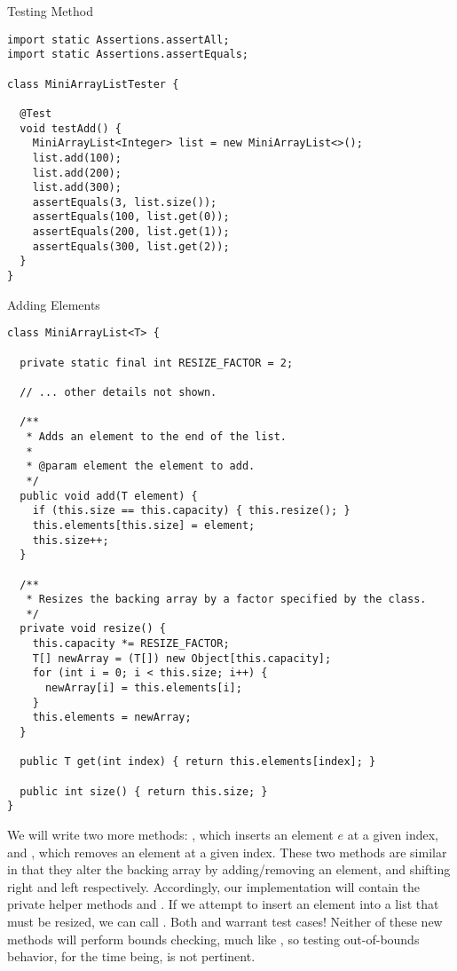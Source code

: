 \begin{cl}{Testing   Method}
\begin{lstlisting}[language=MyJava]
import static Assertions.assertAll;
import static Assertions.assertEquals;

class MiniArrayListTester {

  @Test
  void testAdd() {
    MiniArrayList<Integer> list = new MiniArrayList<>();
    list.add(100);
    list.add(200);
    list.add(300);
    assertEquals(3, list.size());
    assertEquals(100, list.get(0));
    assertEquals(200, list.get(1));
    assertEquals(300, list.get(2));
  }
}
\end{lstlisting}
\end{cl}

\begin{cl}{ Adding Elements}
\begin{lstlisting}[language=MyJava]
class MiniArrayList<T> {

  private static final int RESIZE_FACTOR = 2;

  // ... other details not shown.

  /**
   * Adds an element to the end of the list.
   * 
   * @param element the element to add.
   */
  public void add(T element) {
    if (this.size == this.capacity) { this.resize(); }
    this.elements[this.size] = element;
    this.size++;
  }

  /**
   * Resizes the backing array by a factor specified by the class.
   */
  private void resize() {
    this.capacity *= RESIZE_FACTOR;
    T[] newArray = (T[]) new Object[this.capacity];
    for (int i = 0; i < this.size; i++) {
      newArray[i] = this.elements[i];
    }
    this.elements = newArray;
  }

  public T get(int index) { return this.elements[index]; }

  public int size() { return this.size; }
}
\end{lstlisting}
\end{cl}

We will write two more methods: , which inserts an element $e$ at a given index, and , which removes an element at a given index. These two methods are similar in that they alter the backing array by adding/removing an element, and shifting right and left respectively. Accordingly, our implementation will contain the private helper methods  and . If we attempt to insert an element into a list that must be resized, we can call . Both  and  warrant test cases! Neither of these new methods will perform bounds checking, much like , so testing out-of-bounds behavior, for the time being, is not pertinent.

